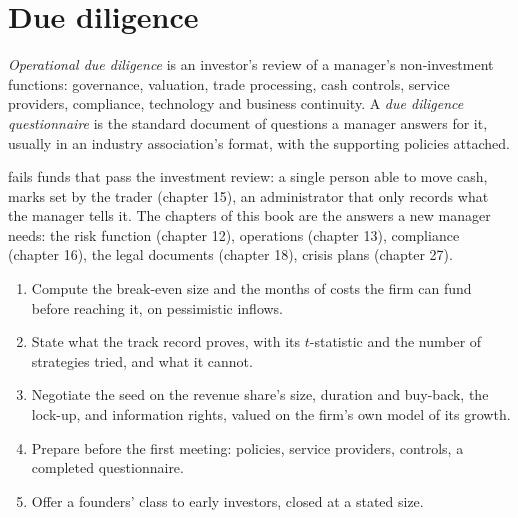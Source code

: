 \section{Due diligence}

\begin{definition}\label{def:fm:launching-a-fund-and-raising-capital:odd}
\emph{Operational due diligence} is an investor's review of a manager's non-investment functions: governance,
valuation, trade processing, cash controls, service providers, compliance, technology and business continuity. A \emph{due diligence
questionnaire} is the standard document of questions a manager answers for it, usually in an industry
association's format, with the supporting policies attached.
\end{definition}

 fails funds that pass the investment review: a single person able to move cash, marks set by the trader (chapter 15), an
administrator that only records what the manager tells it. The chapters of this book are the answers a new manager needs: the risk function
(chapter 12), operations (chapter 13), compliance (chapter 16), the legal documents (chapter 18), crisis plans (chapter 27).

\begin{method}\label{met:fm:launching-a-fund-and-raising-capital:raise}
\begin{enumerate}
\item Compute the break-even size and the months of costs the firm can fund before reaching it, on pessimistic inflows.
\item State what the track record proves, with its $t$-statistic and the number of strategies tried, and what it cannot.
\item Negotiate the seed on the revenue share's size, duration and buy-back, the lock-up,  and information rights, valued on the
firm's own model of its growth.
\item Prepare  before the first meeting: policies, service providers, controls, a completed questionnaire.
\item Offer a founders' class to early investors, closed at a stated size.
\end{enumerate}
\end{method}

